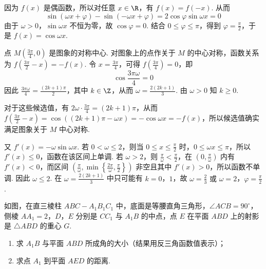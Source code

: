 \begin{solution}
因为 \(f(x)\) 是偶函数，所以对任意 \(x\in\R\)，有 \(f(x)=f(-x)\). 从而
\[
\sin(\omega x+\varphi)-\sin(-\omega x+\varphi)=2\cos\varphi\sin\omega x=0
\]
由于 \(\omega>0\)，\(\sin\omega x\) 不恒为零，故 \(\cos\varphi=0\). 结合 \(0\leqslant\varphi\leqslant\pi\)，得到 \(\varphi=\frac{\pi}{2}\)，于是 \(f(x)=\cos\omega x\).

点 \(M\left(\frac{3\pi}{4},0\right)\) 是图象的对称中心. 对图象上的点作关于 \(M\) 的中心对称，函数关系为 \(f\left(\frac{3\pi}{2}-x\right)=-f(x)\). 令 \(x=\frac{3\pi}{4}\)，可得 \(f\left(\frac{3\pi}{4}\right)=0\)，即
\[
\cos\frac{3\pi\omega}{4}=0
\]
因此 \(\frac{3\pi\omega}{4}=\frac{(2k+1)\pi}{2}\)，其中 \(k\in\Z\)，从而 \(\omega=\frac{2(2k+1)}{3}\). 由 \(\omega>0\) 知 \(k\geqslant0\).

对于这些候选值，有 \(2\omega\cdot\frac{3\pi}{4}=(2k+1)\pi\)，从而 \(f\left(\frac{3\pi}{2}-x\right)=\cos\left((2k+1)\pi-\omega x\right)=-\cos\omega x=-f(x)\)，所以候选值确实满足图象关于 \(M\) 中心对称.

又 \(f'(x)=-\omega\sin\omega x\). 若 \(0<\omega\leqslant2\)，则当 \(0\leqslant x\leqslant\frac{\pi}{2}\) 时，\(0\leqslant\omega x\leqslant\pi\)，所以 \(f'(x)\leqslant0\)，函数在该区间上单调. 若 \(\omega>2\)，则 \(\frac{\pi}{\omega}<\frac{\pi}{2}\)，在 \(\left(0,\frac{\pi}{\omega}\right)\) 内有 \(f'(x)<0\)，而区间 \(\left(\frac{\pi}{\omega},\min\left\{\frac{2\pi}{\omega},\frac{\pi}{2}\right\}\right)\) 非空且其中 \(f'(x)>0\)，所以函数不单调. 因此 \(\omega\leqslant2\). 在 \(\omega=\frac{2(2k+1)}{3}\) 中只可能有 \(k=0\)，\(1\)，故
\(\omega=\frac{2}{3}\text{ 或 }\omega=2\)，\(\varphi=\frac{\pi}{2}\).
\end{solution}

\begin{problem}
如图，在直三棱柱 \(ABC-A_{1}B_{1}C_{1}\) 中，底面是等腰直角三角形，\(\angle ACB=90^{\circ}\)，侧棱 \(AA_{1}=2\)，\(D\)，\(E\) 分别是 \(CC_{1}\) 与 \(A_{1}B\) 的中点，点 \(E\) 在平面 \(ABD\) 上的射影是 \(\triangle ABD\) 的重心 \(G\).

\begin{enumerate}
\item 求 \(A_{1}B\) 与平面 \(ABD\) 所成角的大小（结果用反三角函数值表示）；
\item 求点 \(A_{1}\) 到平面 \(AED\) 的距离.
\end{enumerate}

\end{problem}

